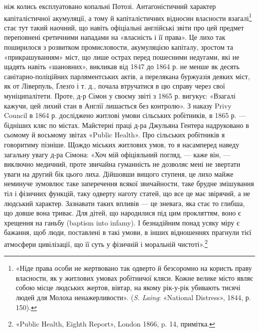 \parcont{}  %
ніж колись експлуатовано копальні Потозі. Антагоністичний
характер капіталістичної акумуляції, а тому й капіталістичних
відносин власности взагалі\footnote{
«Ніде права особи не жертвовано так одверто й безсоромно на
користь праву власности, як у житлових умовах робітничої кляси. Кожне
велике місто являє собою місце людських жертов, вівтар, на якому рік-у-рік
убивають тисячі людей для Молоха ненажерливости». (\emph{S. Laing}:
«National Distress», 1844, р. 150).
} стає тут такий наочний, що навіть
офіціальні англійські звіти про цей предмет переповнені єретичними
нападами на «власність і її права». Це лихо так поширилося
з розвитком промисловости, акумуляцією капіталу, зростом
та «прикрашуванням» міст, що лише острах перед пошесними
недугами, які не щадять навіть «шановних», викликав від 1847
до 1864 р. не менше як десять санітарно-поліційних парляментських
актів, а перелякана буржуазія деяких міст, як от Ліверпуль,
Ґлезґо і т. д., почала втручатися в цю справу через свої
муніципалітети. Проте, д-р Сімон у своєму звіті з 1865 р. вигукує:
«Взагалі кажучи, цей лихий стан в Англії лишається без
контролю». З наказу Privy Council в 1864 р. досліджено житлові
умови сільських робітників, в 1865 р. — бідніших кляс по містах.
Майстерні праці д-ра Джульяна Гентера надруковано в
сьомому й восьмому звітах «Public Health». Про сільських робітників
я говоритиму пізніше. Щождо міських житлових умов,
то я насамперед наведу загальну увагу д-ра Сімона: «Хоч
мій офіціяльний погляд, — каже він, — виключно медичний, проте
звичайна гуманність не дозволяє мені не звертати уваги на другий
бік цього лиха. Дійшовши вищого ступеня, це лихо майже
неминуче зумовлює таке заперечення всякої звичайности, таке
брудне змішування тіл і фізичних функцій, таку одверту наготу
статей, що все це має звірячий, а не людський характер. Зазнавати
таких впливів — це зневага, яка стає то глибша, що довше
вона триває. Для дітей, що народилися під цим прокляттям,
воно є хрещення на ганьбу (baptism into infamy). І безнадійним
понад усяку міру є бажання, щоб люди, поставлені в такі умови,
в інших відношеннях прагнули тієї атмосфери цивілізації, що її
суть у фізичній і моральній чистоті».\footnote{
«Public Health, Eighth Report», London 1866, p. 14, примітка.
}

